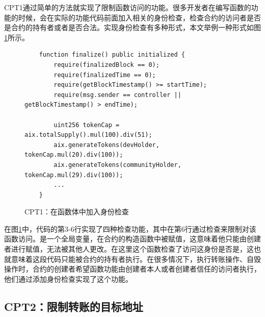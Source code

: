 CPT1通过简单的方法就实现了限制函数访问的功能。很多开发者在编写函数的功能的时候，会在实际的功能代码前面加入相关的身份检查，检查合约的访问者是否是合约的持有者或者是否合法。实现身份检查有多种形式，本文举例一种形式如图\ref{fig:ss1_example}所示。
\begin{figure}
\begin{minipage}[htbp]{1.0\linewidth}
    \begin{lstlisting}
    function finalize() public initialized {
        require(finalizedBlock == 0);
        require(finalizedTime == 0);
        require(getBlockTimestamp() >= startTime);
        require(msg.sender == controller || getBlockTimestamp() > endTime);

        uint256 tokenCap = aix.totalSupply().mul(100).div(51);
        aix.generateTokens(devHolder, tokenCap.mul(20).div(100));
        aix.generateTokens(communityHolder, tokenCap.mul(29).div(100));
        ...
    }
    \end{lstlisting}
\end{minipage}
\vspace{-5mm}
\caption{CPT1：在函数体中加入身份检查}
\label{fig:ss1_example}
\end{figure}
在图\ref{fig:ss1_example}中，代码的第3-6行实现了四种检查功能，其中在第6行通过检查来限制对该函数访问。是一个全局变量，在合约的构造函数中被赋值，这意味着他只能由创建者进行赋值，无法被其他人更改。在这里这个函数检查了访问这身份是否是，这也就意味着这段代码只能被合约的持有者执行。在很多情况下，执行转账操作、自毁操作时，合约的创建者希望函数功能由创建者本人或者创建者信任的访问者执行，他们通过添加身份检查实现了这个功能。
\subsection{CPT2：限制转账的目标地址}

